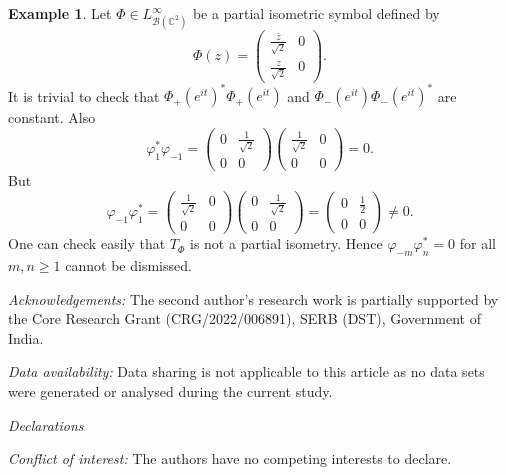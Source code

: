 \documentclass[12pt]{amsart}
\newcommand{\clb}{\mathcal{B}}
\newcommand{\NI}{\noindent}
\newcommand{\C}{\mathbb{C}}
\theoremstyle{definition}
\theoremstyle{plain}
\theoremstyle{definition}
\newtheorem{ex}[thm]{Example}
\numberwithin{equation}{section}
\let\phi=\varphi
\begin{document}
\begin{ex}
Let $\Phi \in L^\infty_{\clb(\C^2)}$ be a partial isometric symbol defined by
\[
\Phi(z)=\begin{pmatrix}
\frac{\bar{z}}{\sqrt{2}}& 0\\
\frac{z}{\sqrt2} &0
\end{pmatrix}.
\]
It is trivial to check that $\Phi_+(e^{it})^*\Phi_+(e^{it})$ and $\Phi_-(e^{it})\Phi_-(e^{it})^*$ are constant. Also
\[
\phi_{1}^*\phi_{-1}=\begin{pmatrix}
0 & \frac{1}{\sqrt{2}}\\
0 &0
\end{pmatrix}
\begin{pmatrix}
\frac{1}{\sqrt{2}} & 0\\
0 &0
\end{pmatrix}=0.
\]
But
\[
\phi_{-1}\phi_{1}^*=\begin{pmatrix}
\frac{1}{\sqrt{2}} & 0\\
0&0
\end{pmatrix}
\begin{pmatrix}
0 &\frac{1}{\sqrt{2}}\\
0 &0
\end{pmatrix}=\begin{pmatrix}
0&\frac{1}{2}\\
0 &0
\end{pmatrix} \neq 0.
\]
One can check easily that $T_\Phi$ is not a partial isometry. 
Hence $\phi_{-m}\phi_{n}^*=0$ for all $m, n \geq 1$ cannot be dismissed.
\end{ex}



\NI\textit{Acknowledgements:} 
The second author's research work is partially supported by the Core Research Grant (CRG/2022/006891), SERB (DST), Government of India. 
\vspace{0.4cm}

\NI\textit{Data availability:}
Data sharing is not applicable to this article as no data sets
were generated or analysed during the current study.
\vspace{0.2cm}

\NI\textit{Declarations}
\vspace{0.2cm}

\NI\textit{Conflict of interest:}
The authors have no competing interests to declare.
\end{document}
